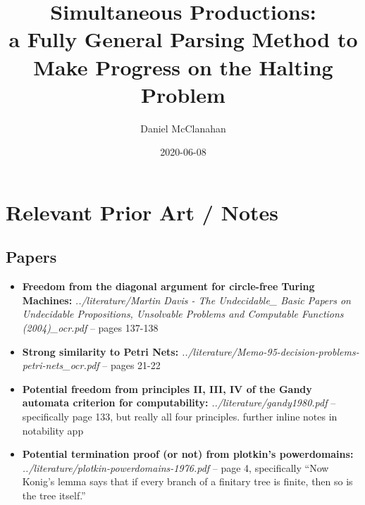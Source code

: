\documentclass{article}
\title{Simultaneous Productions: \\ a Fully General Parsing Method to Make Progress on the Halting Problem}
\date{2020-06-08}
\author{Daniel McClanahan}
\begin{document}
\maketitle

\section{Relevant Prior Art / Notes}
\subsection{Papers}
\begin{itemize}
  \item \textbf{Freedom from the diagonal argument for circle-free Turing Machines:} \textit{../literature/Martin Davis - The Undecidable\_ Basic Papers on Undecidable Propositions, Unsolvable Problems and Computable Functions (2004)\_ocr.pdf} -- pages 137-138
  \item \textbf{Strong similarity to Petri Nets:} \textit{../literature/Memo-95-decision-problems-petri-nets\_ocr.pdf} -- pages 21-22
  \item \textbf{Potential freedom from principles II, III, IV of the Gandy automata criterion for computability:} \textit{../literature/gandy1980.pdf} -- specifically page 133, but really all four principles. further inline notes in notability app
  \item \textbf{Potential termination proof (or not) from plotkin's powerdomains:} \textit{../literature/plotkin-powerdomains-1976.pdf} -- page 4, specifically ``Now Konig’s
lemma says that if every branch of a finitary tree is finite, then so is the tree
itself.''
\end{itemize}
\end{document}
